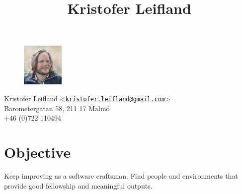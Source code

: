 \documentclass[10pt]{article}
\title{Kristofer Leifland}
\author{}
\date{}
\begin{document}
\maketitle
\thispagestyle{empty}
\pagestyle{empty}
\noindent




\begin{figure}[ht!]
\centering
\includegraphics[width=20mm]{me.jpg}
\end{figure}

\noindent
Kristofer Leifland <\href{mailto:kristofer.leifland@gmail.com}{\nolinkurl{kristofer.leifland@gmail.com}}>\\
Barometergatan 58, 211 17 Malmö\\
+46 (0)722 110494\\


\section*{Objective}
Keep improving as a software craftsman. Find people and environments that provide good fellowship and meaningful outputs.
\end{document}
